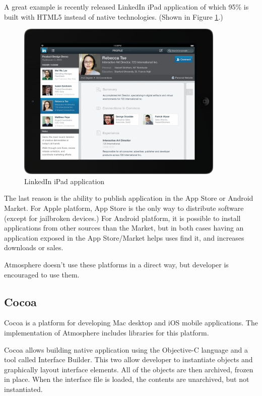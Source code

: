 A great example is recently released LinkedIn iPad application of which 95\% is built with HTML5 instead of native technologies. (Shown in Figure \ref{fig:linkedin}.) \citep{linkedin_ipad}

\begin{figure}[htbp]
  \centering
    \includegraphics[height=3in]{figures/LinkedIn_iPad.jpg}
  \caption{LinkedIn iPad application}
  \label{fig:linkedin}
\end{figure}

The last reason is the ability to publish application in the App Store or Android Market. For Apple platform, App Store is the only way to distribute software (except for jailbroken devices.) For Android platform, it is possible to install applications from other sources than the Market, but in both cases having an application exposed in the App Store/Market helps uses find it, and increases downloads or sales.

Atmosphere doesn’t use these platforms in a direct way, but developer is encouraged to use them. 

\subsection{Cocoa}

Cocoa is a platform for developing Mac desktop and iOS mobile applications. The implementation of Atmosphere includes libraries for this platform.

Cocoa allows building native application using the Objective-C language and a tool called Interface Builder. This two allow developer to instantiate objects and graphically layout interface elements. All of the objects are then archived, frozen in place. When the interface file is loaded, the contents are unarchived, but not instantiated.

